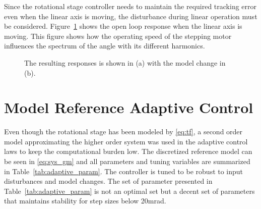 Since the rotational stage controller needs to maintain the required tracking error even when the linear axis is moving, the disturbance during linear operation must be considered. Figure~\ref{fig:dist_diff_speed} shows the open loop response when the linear axis is moving. This figure shows how the operating speed of the stepping motor influences the spectrum of the angle with its different harmonics.

\begin{figure}[h!]
  \centering %
  \qquad
  \caption{\label{fig:dist_diff_speed} The resulting responses is shown in (a) with the model change in (b).}
\end{figure}

\newpage
\FloatBarrier
\section{Model Reference Adaptive Control}
Even though the rotational stage has been modeled by \eqref{eq:tf}, a second order model approximating the higher order system was used in the adaptive control laws to keep the computational burden low. The discretized reference model can be seen in \eqref{eq:sys_gm} and all parameters and tuning variables are summarized in Table~\ref{tab:adaptive_param}. The controller is tuned to be robust to input disturbances and model changes. The set of parameter presented in Table~\ref{tab:adaptive_param} is not an optimal set but a decent set of parameters that maintains stability for step sizes below 20mrad.

